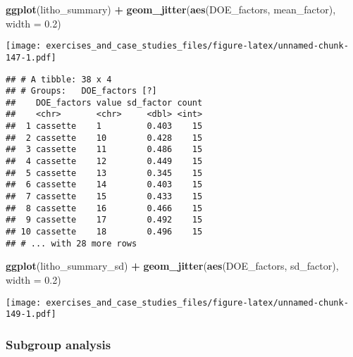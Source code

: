 \documentclass[]{book}
\newenvironment{Shaded}{\begin{snugshade}}{\end{snugshade}}
\newcommand{\DataTypeTok}[1]{\textcolor[rgb]{0.13,0.29,0.53}{#1}}
\newcommand{\FloatTok}[1]{\textcolor[rgb]{0.00,0.00,0.81}{#1}}
\newcommand{\KeywordTok}[1]{\textcolor[rgb]{0.13,0.29,0.53}{\textbf{#1}}}
\newcommand{\NormalTok}[1]{#1}
\newcommand{\OperatorTok}[1]{\textcolor[rgb]{0.81,0.36,0.00}{\textbf{#1}}}
\newcommand{\StringTok}[1]{\textcolor[rgb]{0.31,0.60,0.02}{#1}}
\theoremstyle{definition}
\theoremstyle{definition}
\theoremstyle{definition}
\theoremstyle{remark}
\begin{document}
\begin{Shaded}
\begin{Highlighting}[]
\KeywordTok{ggplot}\NormalTok{(litho_summary) }\OperatorTok{+}
\StringTok{  }\KeywordTok{geom_jitter}\NormalTok{(}\KeywordTok{aes}\NormalTok{(DOE_factors, mean_factor), }\DataTypeTok{width =} \FloatTok{0.2}\NormalTok{)}
\end{Highlighting}
\end{Shaded}

\texttt{[image: exercises\_and\_case\_studies\_files/figure-latex/unnamed-chunk-147-1.pdf]}

\begin{Shaded}
\end{Shaded}

\begin{verbatim}
## # A tibble: 38 x 4
## # Groups:   DOE_factors [?]
##    DOE_factors value sd_factor count
##    <chr>       <chr>     <dbl> <int>
##  1 cassette    1         0.403    15
##  2 cassette    10        0.428    15
##  3 cassette    11        0.486    15
##  4 cassette    12        0.449    15
##  5 cassette    13        0.345    15
##  6 cassette    14        0.403    15
##  7 cassette    15        0.433    15
##  8 cassette    16        0.466    15
##  9 cassette    17        0.492    15
## 10 cassette    18        0.496    15
## # ... with 28 more rows
\end{verbatim}

\begin{Shaded}
\begin{Highlighting}[]
\KeywordTok{ggplot}\NormalTok{(litho_summary_sd) }\OperatorTok{+}
\StringTok{  }\KeywordTok{geom_jitter}\NormalTok{(}\KeywordTok{aes}\NormalTok{(DOE_factors, sd_factor), }\DataTypeTok{width =} \FloatTok{0.2}\NormalTok{)}
\end{Highlighting}
\end{Shaded}

\texttt{[image: exercises\_and\_case\_studies\_files/figure-latex/unnamed-chunk-149-1.pdf]}

\hypertarget{subgroup-analysis}{%
\subsubsection{Subgroup analysis}\label{subgroup-analysis}}
\end{document}
